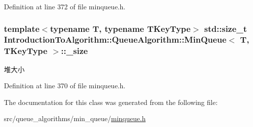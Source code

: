 Definition at line 372 of file minqueue.\+h.

\hypertarget{class_introduction_to_algorithm_1_1_queue_algorithm_1_1_min_queue_a0de92802e37516dda2c01de776aba641}{}
\subsubsection[{\+\_\+size}]{\setlength{\rightskip}{0pt plus 5cm}template$<$typename T, typename T\+Key\+Type$>$ std\+::size\+\_\+t {\bf Introduction\+To\+Algorithm\+::\+Queue\+Algorithm\+::\+Min\+Queue}$<$ T, T\+Key\+Type $>$\+::\+\_\+size\hspace{0.3cm}{\ttfamily [private]}}\label{class_introduction_to_algorithm_1_1_queue_algorithm_1_1_min_queue_a0de92802e37516dda2c01de776aba641}
堆大小 

Definition at line 370 of file minqueue.\+h.



The documentation for this class was generated from the following file\+:\begin{DoxyCompactItemize}
\item 
src/queue\+\_\+algorithms/min\+\_\+queue/\hyperlink{minqueue_8h}{minqueue.\+h}\end{DoxyCompactItemize}
